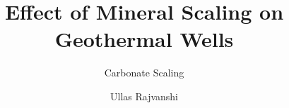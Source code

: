 \documentclass[whitelogo]{tudelft-report}
\begin{document}
\frontmatter


\title[tudelft-white]{Effect of Mineral Scaling on Geothermal Wells}
\subtitle[tudelft-cyan]{Carbonate Scaling}
\author[tudelft-white]{Ullas Rajvanshi}
\makecover[split]





\tableofcontents

\mainmatter








\appendix

%


\end{document}
